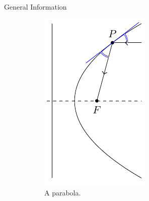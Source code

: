 \begin{stbox}{General Information}{}
\begin{figure}[H]
\begin{subfigure}{0.22\textwidth}
      \includegraphics[width=\textwidth]{../Diagrams/Conics/parabola-cropped.pdf}
      \caption{A parabola.}
      \label{fig:parabola2}
    \end{subfigure}\hspace{0.1\textwidth}
    \begin{subfigure}{0.45\textwidth}
        \centering

\end{subfigure}
\end{figure}
\end{stbox}
